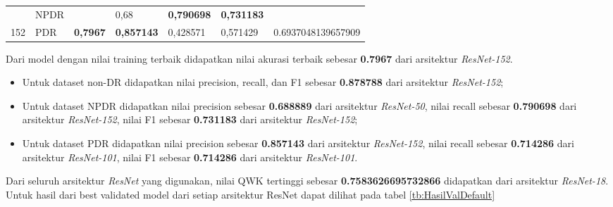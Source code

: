 \begin{table}[hbtp]
\begin{center}
\begin{tabular}{|c|l|c|l|l|l|c|}
			& NPDR                                               &                          & 0,68                                              & \textbf{0,790698}                                         & \textbf{0,731183}                                        &                                      \\ \cline{2-2} \cline{4-6}
			\multirow{-3}{*}{152} & PDR                                                & \multirow{-3}{*}{\textbf{0,7967}} & \textbf{0,857143}                                          & 0,428571                                         & 0,571429                                        & \multirow{-3}{*}{0.6937048139657909} \\ \hline
		\end{tabular}
	\end{center}
\end{table}

Dari model dengan nilai training terbaik didapatkan nilai akurasi terbaik sebesar \textbf{0.7967} dari arsitektur \emph{ResNet-152}.

\begin{itemize}

\item Untuk dataset non-DR didapatkan nilai precision, recall, dan F1 sebesar \textbf{0.878788} dari arsitektur \emph{ResNet-152};

\item Untuk dataset NPDR didapatkan nilai precision sebesar \textbf{0.688889} dari arsitektur \emph{ResNet-50}, nilai recall sebesar \textbf{0.790698} dari arsitektur \emph{ResNet-152}, nilai F1 sebesar \textbf{0.731183} dari arsitektur \emph{ResNet-152};

\item Untuk dataset PDR didapatkan nilai precision sebesar \textbf{0.857143} dari arsitektur \emph{ResNet-152}, nilai recall sebesar \textbf{0.714286} dari arsitektur \emph{ResNet-101}, nilai F1 sebesar \textbf{0.714286} dari arsitektur \emph{ResNet-101}.

\end{itemize}

Dari seluruh arsitektur \emph{ResNet} yang digunakan, nilai QWK tertinggi sebesar \textbf{0.7583626695732866} didapatkan dari arsitektur \emph{ResNet-18}. Untuk hasil dari best validated model dari setiap arsitektur ResNet dapat dilihat pada tabel \ref{tb:HasilValDefault}

\pagebreak

